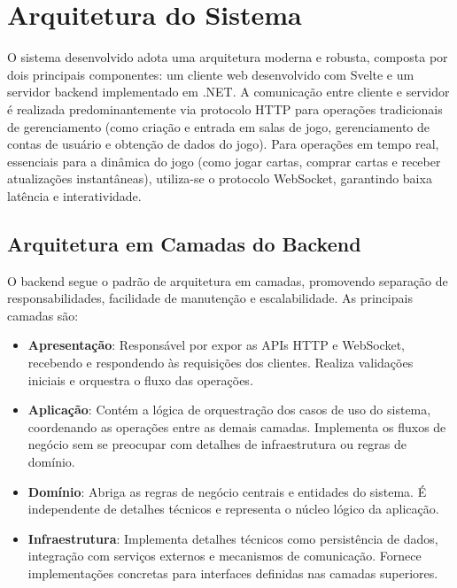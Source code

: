 \chapter{Arquitetura do Sistema}

O sistema desenvolvido adota uma arquitetura moderna e robusta, composta por dois principais componentes: um cliente web desenvolvido com Svelte e um servidor backend implementado em .NET. A comunicação entre cliente e servidor é realizada predominantemente via protocolo HTTP para operações tradicionais de gerenciamento (como criação e entrada em salas de jogo, gerenciamento de contas de usuário e obtenção de dados do jogo). Para operações em tempo real, essenciais para a dinâmica do jogo (como jogar cartas, comprar cartas e receber atualizações instantâneas), utiliza-se o protocolo WebSocket, garantindo baixa latência e interatividade.

\section{Arquitetura em Camadas do Backend}
O backend segue o padrão de arquitetura em camadas, promovendo separação de responsabilidades, facilidade de manutenção e escalabilidade. As principais camadas são:

\begin{itemize}
    \item \textbf{Apresentação}: Responsável por expor as APIs HTTP e WebSocket, recebendo e respondendo às requisições dos clientes. Realiza validações iniciais e orquestra o fluxo das operações.
    \item \textbf{Aplicação}: Contém a lógica de orquestração dos casos de uso do sistema, coordenando as operações entre as demais camadas. Implementa os fluxos de negócio sem se preocupar com detalhes de infraestrutura ou regras de domínio.
    \item \textbf{Domínio}: Abriga as regras de negócio centrais e entidades do sistema. É independente de detalhes técnicos e representa o núcleo lógico da aplicação.
    \item \textbf{Infraestrutura}: Implementa detalhes técnicos como persistência de dados, integração com serviços externos e mecanismos de comunicação. Fornece implementações concretas para interfaces definidas nas camadas superiores.
\end{itemize}

